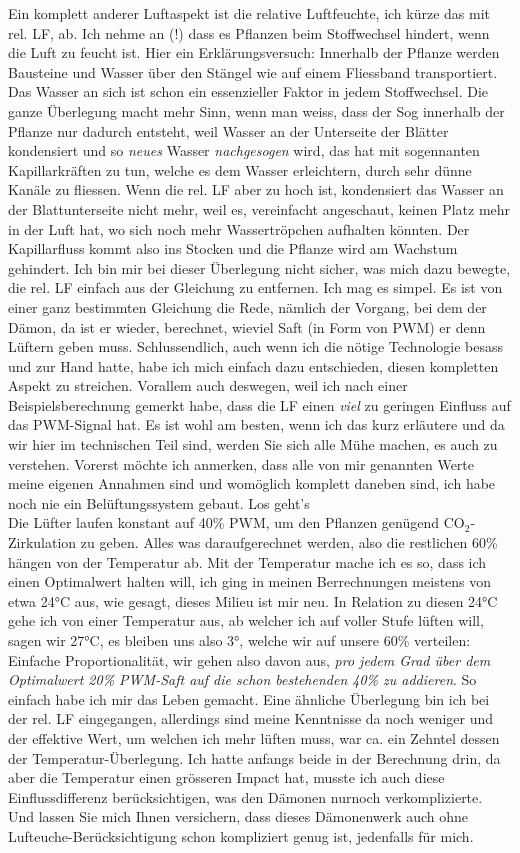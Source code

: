 \documentclass[12pt,titlepage,a4paper]{article}
\begin{document}
Ein komplett anderer Luftaspekt ist die relative Luftfeuchte, ich kürze das mit rel. LF, ab. Ich nehme an (!) dass es Pflanzen beim Stoffwechsel hindert, wenn die Luft zu feucht ist. Hier ein Erklärungsversuch: Innerhalb der Pflanze werden Bausteine und Wasser über den Stängel wie auf einem Fliessband transportiert. Das Wasser an sich ist schon ein essenzieller Faktor in jedem Stoffwechsel. Die ganze Überlegung macht mehr Sinn, wenn man weiss, dass der Sog innerhalb der Pflanze nur dadurch entsteht, weil Wasser an der Unterseite der Blätter kondensiert und so \textit{neues} Wasser \textit{nachgesogen} wird, das hat mit sogennanten Kapillarkräften zu tun, welche es dem Wasser erleichtern, durch sehr dünne Kanäle zu fliessen. Wenn die rel. LF aber zu hoch ist, kondensiert das Wasser an der Blattunterseite nicht mehr, weil es, vereinfacht angeschaut, keinen Platz mehr in der Luft hat, wo sich noch mehr Wassertröpchen aufhalten könnten. Der Kapillarfluss kommt also ins Stocken und die Pflanze wird am Wachstum gehindert. Ich bin mir bei dieser Überlegung nicht sicher, was mich dazu bewegte, die rel. LF einfach aus der Gleichung zu entfernen. Ich mag es simpel. Es ist von einer ganz bestimmten Gleichung die Rede, nämlich der Vorgang, bei dem der Dämon, da ist er wieder, berechnet, wieviel Saft (in Form von PWM) er denn Lüftern geben muss. Schlussendlich, auch wenn ich die nötige Technologie besass und zur Hand hatte, habe ich mich einfach dazu entschieden, diesen kompletten Aspekt zu streichen. Vorallem auch deswegen, weil ich nach einer Beispielsberechnung gemerkt habe, dass die LF einen \textit{viel} zu geringen Einfluss auf das PWM-Signal hat. Es ist wohl am besten, wenn ich das kurz erläutere und da wir hier im technischen Teil sind, werden Sie sich alle Mühe machen, es auch zu verstehen. Vorerst möchte ich anmerken, dass alle von mir genannten Werte meine eigenen Annahmen sind und womöglich komplett daneben sind, ich habe noch nie ein Belüftungssystem gebaut. Los geht's\\Die Lüfter laufen konstant auf 40\% PWM, um den Pflanzen genügend CO$ _{2} $-Zirkulation zu geben. Alles was daraufgerechnet werden, also die restlichen 60\% hängen von der Temperatur ab. Mit der Temperatur mache ich es so, dass ich einen Optimalwert halten will, ich ging in meinen Berrechnungen meistens von etwa 24°C aus, wie gesagt, dieses Milieu ist mir neu. In Relation zu diesen 24°C gehe ich von einer Temperatur aus, ab welcher ich auf voller Stufe lüften will, sagen wir 27°C, es bleiben uns also 3°, welche wir auf unsere 60\% verteilen: Einfache Proportionalität, wir gehen also davon aus, \textit{pro jedem Grad über dem Optimalwert 20\% PWM-Saft auf die schon bestehenden 40\% zu addieren}. So einfach habe ich mir das Leben gemacht. Eine ähnliche Überlegung bin ich bei der rel. LF eingegangen, allerdings sind meine Kenntnisse da noch weniger und der effektive Wert, um welchen ich mehr lüften muss, war ca. ein Zehntel dessen der Temperatur-Überlegung. Ich hatte anfangs beide in der Berechnung drin, da aber die Temperatur einen grösseren Impact hat, musste ich auch diese Einflussdifferenz berücksichtigen, was den Dämonen nurnoch verkomplizierte. Und lassen Sie mich Ihnen versichern, dass dieses Dämonenwerk auch ohne Lufteuche-Berücksichtigung schon kompliziert genug ist, jedenfalls für mich.
\end{document}
